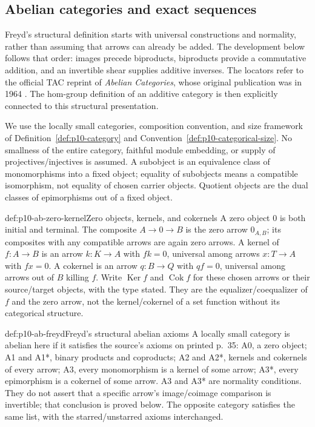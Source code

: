 \subsection{Abelian categories and exact sequences}
\label{sec:p10-abelian-exact}

Freyd's structural definition starts with universal constructions and
normality, rather than assuming that arrows can already be added.
The development below follows that order: images precede biproducts,
biproducts provide a commutative addition, and an invertible shear supplies
additive inverses. The locators refer to the official TAC reprint of
\emph{Abelian Categories}, whose original publication was in 1964
\cite{Freyd2003TAC}. The hom-group definition of an additive category is
then explicitly connected to this structural presentation.

We use the locally small categories, composition convention, and size
framework of Definition~\ref{def:p10-category} and
Convention~\ref{def:p10-categorical-size}. No smallness of the entire
category, faithful module embedding, or supply of projectives/injectives
is assumed. A subobject is an equivalence class of monomorphisms into
a fixed object; equality of subobjects means a compatible isomorphism,
not equality of chosen carrier objects. Quotient objects are the dual
classes of epimorphisms out of a fixed object.

\begin{hbdefinition}{def:p10-ab-zero-kernel}{Zero objects, kernels, and cokernels}
A zero object \(0\) is both initial and terminal. The composite
\(A\to0\to B\) is the zero arrow \(0_{A,B}\); its composites with
any compatible arrows are again zero arrows. A kernel of \(f:A\to B\)
is an arrow \(k:K\to A\) with \(fk=0\), universal among arrows
\(x:T\to A\) with \(fx=0\). A cokernel is an arrow \(q:B\to Q\)
with \(qf=0\), universal among arrows out of \(B\) killing \(f\).
Write \(\operatorname{Ker}f\) and \(\operatorname{Cok}f\) for these
chosen arrows or their source/target objects, with the type stated.
They are the equalizer/coequalizer of \(f\) and the zero arrow, not
the kernel/cokernel of a set function without its categorical structure.
\end{hbdefinition}

\begin{hbdefinition}{def:p10-ab-freyd}{Freyd's structural abelian axioms}
A locally small category is abelian here if it satisfies the source's
axioms on printed p.~35: A0, a zero object; A1 and A1*, binary products
and coproducts; A2 and A2*, kernels and cokernels of every arrow; A3,
every monomorphism is a kernel of some arrow; A3*, every epimorphism
is a cokernel of some arrow. A3 and A3* are normality conditions.
They do not assert that a specific arrow's image/coimage comparison is
invertible; that conclusion is proved below. The opposite category
satisfies the same list, with the starred/unstarred axioms interchanged.
\end{hbdefinition}


